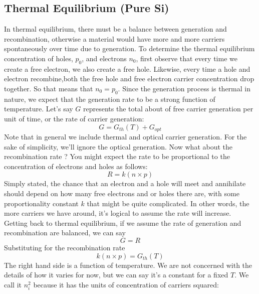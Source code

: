\subsection{Thermal Equilibrium (Pure Si)}
In thermal equilibrium, there must be a balance between generation and recombination, otherwise a material would have more and more carriers spontaneously over time due to generation.  To determine the thermal equilibrium concentration of holes, $p_0$, and electrons $n_0$, first observe that  every time we create a free electron, we also create a free hole.  Likewise, every time a hole and electron recombine,both the free hole and free electron carrier concentration drop together.  So that means that $n_0 =  p_0 $.
Since the generation process is thermal in nature, we expect that the generation rate to be a strong function of temperature.
Let’s say $G$ represents the total about of free carrier generation per unit of time, or the rate of carrier generation:
    \begin{equation}
        G = {G_{th}}(T) + {G_{opt}}
    \end{equation}
Note that in general we include thermal and optical carrier generation.  For the sake of simplicity, we’ll ignore the optical generation.  Now what about the recombination rate ?  You might expect the rate to be proportional to the concentration of electrons and holes as follows:
    \begin{equation}
        R = k(n \times p) 
    \end{equation}
Simply stated, the chance that an electron and a hole will meet and annihilate should depend on how many free electrons and or holes there are, with some proportionality constant $k$ that might be quite complicated.  In other words, the more carriers we have around, it’s logical to assume the rate will increase. 
Getting back to thermal equilibrium, if we assume the rate of generation and recombination are balanced, we can say
    \begin{equation}
        G = R
    \end{equation}
Substituting for the recombination rate
    \begin{equation}
        k(n \times p) = {G_{th}}(T)
    \end{equation}
The right hand side is a function of temperature.  We are not concerned with the details of how it varies for now, but we can say it’s a constant for a fixed $T$.  We call it $n_i^2$ because it has the units of concentration of carriers squared:
